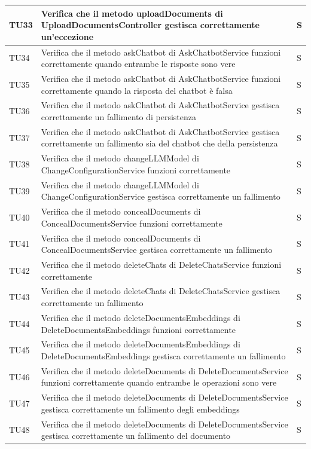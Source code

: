 \documentclass[10pt, a4paper]{article}
\begin{document}
\begin{xltabular}{\textwidth}{p{0.12\textwidth}|p{0.7\textwidth}|X}
\hline
TU33 & Verifica che il metodo uploadDocuments di UploadDocumentsController gestisca correttamente un'eccezione & S \\
\hline
TU34 & Verifica che il metodo askChatbot di AskChatbotService funzioni correttamente quando entrambe le risposte sono vere & S \\
\hline
TU35 & Verifica che il metodo askChatbot di AskChatbotService funzioni correttamente quando la risposta del chatbot è falsa & S \\
\hline
TU36 & Verifica che il metodo askChatbot di AskChatbotService gestisca correttamente un fallimento di persistenza & S \\
\hline
TU37 & Verifica che il metodo askChatbot di AskChatbotService gestisca correttamente un fallimento sia del chatbot che della persistenza & S \\
\hline
TU38 & Verifica che il metodo changeLLMModel di ChangeConfigurationService funzioni correttamente & S \\
\hline
TU39 & Verifica che il metodo changeLLMModel di ChangeConfigurationService gestisca correttamente un fallimento & S \\
\hline
TU40 & Verifica che il metodo concealDocuments di ConcealDocumentsService funzioni correttamente & S \\
\hline
TU41 & Verifica che il metodo concealDocuments di ConcealDocumentsService gestisca correttamente un fallimento & S \\
\hline
TU42 & Verifica che il metodo deleteChats di DeleteChatsService funzioni correttamente & S \\
\hline
TU43 & Verifica che il metodo deleteChats di DeleteChatsService gestisca correttamente un fallimento & S \\
\hline
TU44 & Verifica che il metodo deleteDocumentsEmbeddings di DeleteDocumentsEmbeddings funzioni correttamente & S \\
\hline
TU45 & Verifica che il metodo deleteDocumentsEmbeddings di DeleteDocumentsEmbeddings gestisca correttamente un fallimento & S \\
\hline
TU46 & Verifica che il metodo deleteDocuments di DeleteDocumentsService funzioni correttamente quando entrambe le operazioni sono vere & S \\
\hline
TU47 & Verifica che il metodo deleteDocuments di DeleteDocumentsService gestisca correttamente un fallimento degli embeddings & S \\
\hline
TU48 & Verifica che il metodo deleteDocuments di DeleteDocumentsService gestisca correttamente un fallimento del documento & S \\

\end{xltabular}
\end{document}
